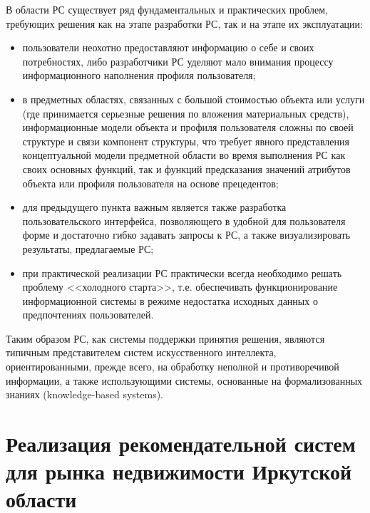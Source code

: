 \documentclass[a4paper,14pt,openany,final]{extreport} %
\begin{document}
В области РС существует ряд фундаментальных и практических проблем, требующих решения как на этапе разработки РС, так и на этапе их эксплуатации:
\begin{itemize}
\item пользователи неохотно предоставляют информацию о себе и
  своих потребностях, либо разработчики РС уделяют мало внимания
  процессу информационного наполнения профиля пользователя;
\item в предметных областях, связанных с большой стоимостью объекта или услуги (где принимается серьезные решения по вложения материальных средств), информационные модели объекта и профиля пользователя сложны по своей структуре и связи компонент структуры, что требует явного представления концептуальной модели предметной области во время выполнения РС как своих основных функций, так и функций предсказания значений атрибутов объекта или профиля пользователя на основе прецедентов;
\item для предыдущего пункта важным является также разработка пользовательского интерфейса, позволяющего в удобной для пользователя форме и достаточно гибко задавать запросы к РС, а также визуализировать результаты, предлагаемые РС;
\item при практической реализации РС практически всегда необходимо решать проблему <<холодного старта>>, т.е. обеспечивать функционирование информационной системы в режиме недостатка исходных данных о предпочтениях пользователей.
\end{itemize}
Таким образом РС, как системы поддержки принятия решения, являются типичным представителем систем искусственного интеллекта, ориентированными, прежде всего, на обработку неполной и противоречивой информации, а также использующими системы, основанные на формализованных знаниях (\foreignlanguage{english}{knowledge-based systems}).


\chapter{Реализация рекомендательной систем для рынка недвижимости Иркутской области}
\label{chap:dev-tech-theory}
\end{document}
